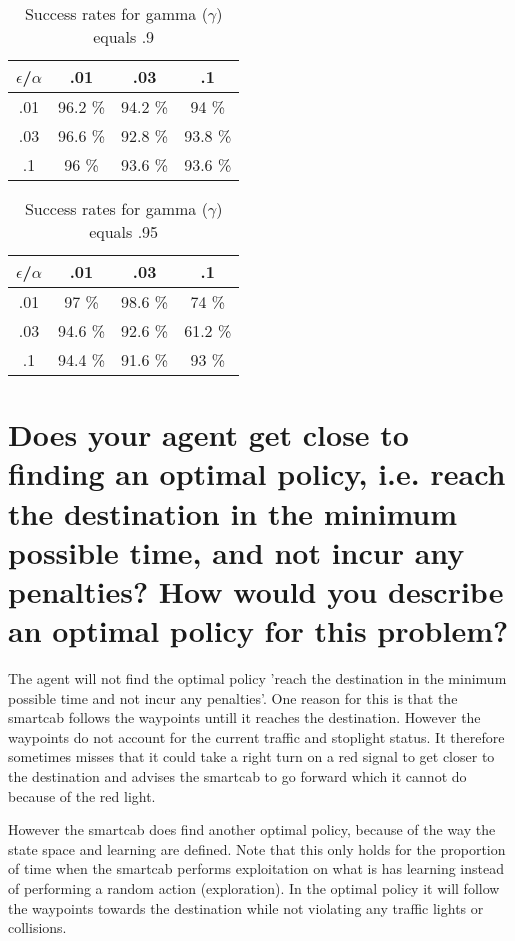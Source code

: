 \documentclass{article}
\begin{document}
\begin{table}
\centering
\begin{tabular}{c | c | c | c |}
\hline
$\epsilon$/$\alpha$ & .01 & .03 & .1 \\ \hline
.01 & 96.2 \% & 94.2 \% & 94 \% \\ \hline
.03 & 96.6 \% & 92.8 \% & 93.8 \% \\ \hline
.1 & 96 \% & 93.6 \% &  93.6 \%  \\ \hline
\end{tabular}
\caption{Success rates for gamma ($\gamma$) equals .9}
\end{table}

\begin{table}
\centering
\begin{tabular}{c | c | c | c |}
\hline
$\epsilon$/$\alpha$ & .01 & .03 & .1 \\ \hline
.01 & 97 \% & 98.6 \% & 74 \% \\ \hline
.03 & 94.6 \% & 92.6 \% & 61.2 \% \\ \hline
.1 & 94.4 \% & 91.6 \% & 93 \% \\  \hline
\end{tabular}
\caption{Success rates for gamma ($\gamma$) equals .95}
\end{table}

\section*{Does your agent get close to finding an optimal policy, i.e. reach the destination in the minimum possible time, and not incur any penalties? How would you describe an optimal policy for this problem?}

The agent will not find the optimal policy 'reach the destination in the minimum possible time and not incur any penalties'. One reason for this is that the smartcab follows the waypoints untill it reaches the destination. However the waypoints do not account for the current traffic and stoplight status. It therefore sometimes misses that it could take a right turn on a red signal to get closer to the destination and advises the smartcab to go forward which it cannot do because of the red light.

However the smartcab does find another optimal policy, because of the way the state space and learning are defined. Note that this only holds for the proportion of time when the smartcab performs exploitation on what is has learning instead of performing a random action (exploration). In the optimal policy it will follow the waypoints towards the destination while not violating any traffic lights or collisions. 
\end{document}
